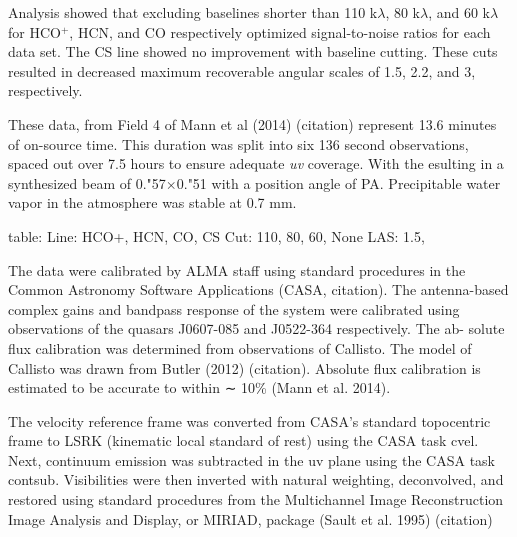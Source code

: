 Analysis showed that excluding baselines shorter than 110 k$\lambda$, 80 k$\lambda$, and 60 k$\lambda$ for HCO$^{+}$, HCN, and CO respectively optimized signal-to-noise ratios for each data set. The CS line showed no improvement with baseline cutting. These cuts resulted in decreased maximum recoverable angular scales of 1.5, 2.2, and 3, respectively.

These data, from Field 4 of Mann et al (2014) (citation) represent 13.6 minutes of on-source time. This duration was split into six 136 second observations, spaced out over 7.5 hours to ensure adequate \textit{uv} coverage. With the esulting in a synthesized beam of 0."57$\times$0."51 with a position angle of PA. Precipitable water vapor in the atmosphere was stable at 0.7 mm.


table:
Line: HCO+, HCN, CO, CS
Cut:  110,  80,  60, None
LAS:  1.5,


The data were calibrated by ALMA staff using standard procedures in the Common Astronomy Software Applications (CASA, citation). The antenna-based complex gains and bandpass response of the system were calibrated using observations of the quasars J0607-085 and J0522-364 respectively. The ab- solute flux calibration was determined from observations of Callisto. The model of Callisto was drawn from Butler (2012) (citation). Absolute flux calibration is estimated to be accurate to within ∼ 10\% (Mann et al. 2014).

The velocity reference frame was converted from CASA's standard topocentric frame to LSRK (kinematic local standard of rest) using the CASA task cvel. Next, continuum emission was subtracted in the uv plane using the CASA task contsub. Visibilities were then inverted with natural weighting, deconvolved, and restored using standard procedures from the Multichannel Image Reconstruction Image Analysis and Display, or MIRIAD, package (Sault et al. 1995) (citation)








\iffalse
Things to get:
* noise profiles as func of baseline
* Noise levels
* Beam size, max angular scales after baseline cuts (how to get that?)
* Beam position angle
* Does ICR use natural weighting? (using robust=2)
\fi
